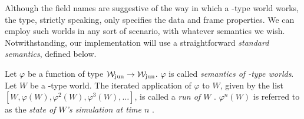 Although the field names are suggestive of the way in which a \wjun-type world works, the type, strictly speaking, only specifies the data and frame properties. We can employ such worlds in any sort of scenario, with whatever semantics we wish. Notwithstanding, our implementation will use a straightforward {\em standard semantics}, defined below.

\begin{definition}
Let $\varphi$ be a function of type $\mathcal{W}_{\mathrm{jun}} \rightarrow \mathcal{W}_{\mathrm{jun}}$. $\varphi$ is called {\em semantics of \wjun-type worlds}.
Let $W$ be a \wjun-type world. The iterated application of $\varphi$ to $W$, given by the list ${[W, \varphi(W), \varphi^2(W), \varphi^3(W), \dots]}$, is called a {\em run of $W$ }. $\varphi^n(W)$ is referred to as the {\em state of $W$'s simulation at time $n$ }.
\end{definition}

